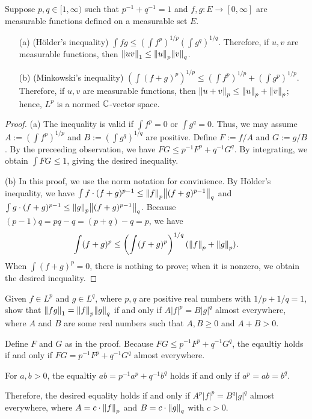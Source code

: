 \begin{prop}
    Suppose $p, q\in[1, \infty)$ such that $p^{-1}+q^{-1}=1$ and $f, g: E\rightarrow[0, \infty]$ are measurable functions defined on a measurable set $E$.
    \begin{enumerate}
        \item[(a)]
        {
            (H\"{o}lder's inequality)
            $\int{fg}\leq\left(\int f^p\right)^{1/p}\left(\int g^q\right)^{1/q}$.
            Therefore, if $u, v$ are measurable functions, then ${\left\lVert{uv}\right\rVert}_1\leq{\left\lVert{u}\right\rVert}_p{\left\lVert{v}\right\rVert}_q$.
        }
        \item[(b)]
        {
            (Minkowski's inequality)
            $\left(\int(f+g)^p\right)^{1/p}\leq\left(\int f^p\right)^{1/p}+\left(\int g^p\right)^{1/p}$.
            Therefore, if $u, v$ are measurable functions, then ${\left\lVert{u+v}\right\rVert}_p\leq{\left\lVert{u}\right\rVert}_p+{\left\lVert{v}\right\rVert}_p$; hence, $L^p$ is a normed ${\mathbb{C}}$-vector space.
        }
    \end{enumerate}
\end{prop}
\begin{proof}
    \hangindent=0.65cm
    \noindent(a)
        The inequality is valid if $\int f^p=0$ or $\int g^q=0$.
        Thus, we may assume $A:=\left(\int f^p\right)^{1/p}$ and $B:=\left(\int g^q\right)^{1/q}$ are positive.
        Define $F:=f/A$ and $G:=g/B$.
        By the preceeding observation, we have $FG\leq p^{-1}F^p+q^{-1}G^q$.
        By integrating, we obtain $\int FG\leq 1$, giving the desired inequality.
    
    \noindent(b)
        In this proof, we use the norm notation for convinience.
        By H\"{o}lder's inequality, we have $\int f\cdot(f+g)^{p-1}\leq{\left\lVert{f}\right\rVert}_p{\left\lVert{(f+g)^{p-1}}\right\rVert}_q$ and $\int g\cdot(f+g)^{p-1}\leq{\left\lVert{g}\right\rVert}_p{\left\lVert{(f+g)^{p-1}}\right\rVert}_q$.
        Because $(p-1)q=pq-q=(p+q)-q=p$, we have
        \begin{align*}
            \int(f+g)^p\leq\left(\int (f+g)^p\right)^{1/q}({\left\lVert{f}\right\rVert}_p+{\left\lVert{g}\right\rVert}_p).
        \end{align*}
        When $\int (f+g)^p=0$, there is nothing to prove; when it is nonzero, we obtain the desired inequality.
\end{proof}

\begin{prob}
    Given $f\in L^p$ and $g\in L^q$, where $p, q$ are positive real numbers with $1/p+1/q=1$, show that ${\left\lVert{fg}\right\rVert}_1={\left\lVert{f}\right\rVert}_p{\left\lVert{g}\right\rVert}_q$ if and only if $A|f|^p=B|g|^q$ almost everywhere, where $A$ and $B$ are some real numbers such that $A, B\geq 0$ and $A+B>0$.
\end{prob}
\begin{sol}
    Define $F$ and $G$ as in the proof.
    Because $FG\leq p^{-1}F^p+q^{-1}G^q$, the eqaultiy holds if and only if $FG=p^{-1}F^p+q^{-1}G^q$ almost everywhere.
    \begin{rmk}
        For $a, b>0$, the equaltiy $ab=p^{-1}a^p+q^{-1}b^q$ holds if and only if $a^p=ab=b^q$.
    \end{rmk}
    Therefore, the desired equality holds if and only if $A^p|f|^p=B^q|g|^q$ almost everywhere, where $A=c\cdot{\left\lVert{f}\right\rVert}_p$ and $B=c\cdot{\left\lVert{g}\right\rVert}_q$ with $c>0$.
\end{sol}

